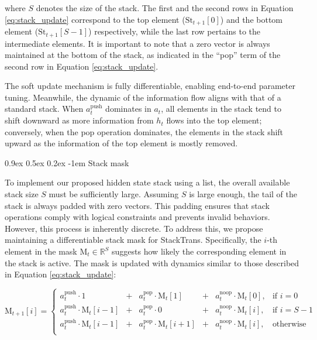 \documentclass{article}
\makeatletter
\providecommand{\paragraph}{}
\renewcommand{\paragraph}[1]{%
  \@startsection{paragraph}{4}{\z@}%
                {0.9ex \@plus 0.5ex \@minus 0.2ex}%
                {-1em}%
                {\normalsize\bfseries}%
  {#1}
}
\DeclareRobustCommand{\method}{{\sc StackTrans}\xspace}
\makeatother
\begin{document}
\noindent where $S$ denotes the size of the stack.
The first and the second rows in Equation \ref{eq:stack_update} correspond to the top element ($\text{St}_{t+1}[0]$) and the bottom element ($\text{St}_{t+1}[S-1]$) respectively, while the last row pertains to the intermediate elements.
It is important to note that a zero vector is always maintained at the bottom of the stack, as indicated in the “pop” term of the second row in Equation \ref{eq:stack_update}.


The soft update mechanism is fully differentiable, enabling end-to-end parameter tuning.
Meanwhile, the dynamic of the information flow aligns with that of a standard stack.
When $a_t^{\text{push}}$ dominates in $a_t$, all elements in the stack tend to shift downward as more information from $h_t$ flows into the top element;
conversely, when the pop operation dominates, the elements in the stack shift upward as the information of the top element is mostly removed.


\paragraph{Stack mask}
To implement our proposed hidden state stack using a list, the overall available stack size $S$ must be sufficiently large.
Assuming $S$ is large enough, the tail of the stack is always padded with zero vectors.
This padding ensures that stack operations comply with logical constraints and prevents invalid behaviors.
However, this process is inherently discrete. To address this, we propose maintaining a differentiable stack mask for \method.
Specifically, the $i$-th element in the mask $\text{M}_t\in\mathbb{R}^S$ suggests how likely the corresponding element in the stack is active.
The mask is updated with dynamics similar to those described in Equation \ref{eq:stack_update}:


\vspace{-10pt}
\begin{equation}
\text{M}_{t+1}[i] = \left\{
\begin{array}{lclcll}
a_t^{\text{push}}\cdot 1 &+& a_t^{\text{pop}} \cdot \text{M}_{t}[1] &+& a_t^{\text{noop}} \cdot \text{M}_{t}[0], & \text{if } i = 0 \\[3pt]
a_t^{\text{push}} \cdot \text{M}_{t}[i-1] &+& a_t^{\text{pop}} \cdot 0 &+& a_t^{\text{noop}} \cdot \text{M}_{t}[i], & \text{if } i =  S-1 \\[3pt]
a_t^{\text{push}} \cdot \text{M}_{t}[i-1] &+& a_t^{\text{pop}} \cdot \text{M}_{t}[i+1] &+& a_t^{\text{noop}} \cdot \text{M}_{t}[i], & \text{otherwise} \\[3pt]
\end{array}\right.
\label{eq:mask_update}
\end{equation}
\end{document}
